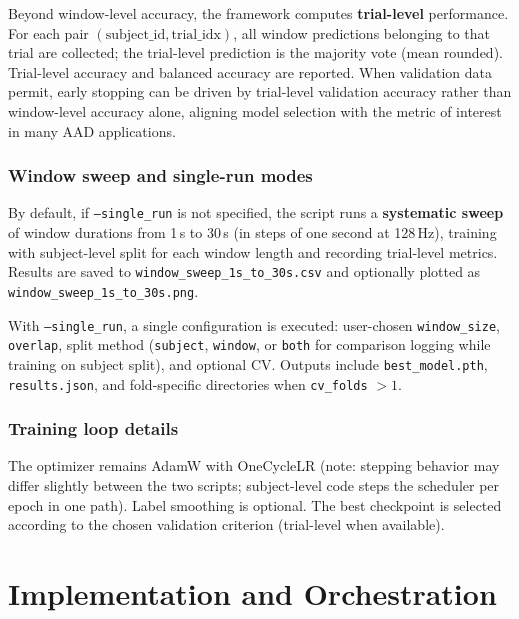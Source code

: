 \documentclass[11pt,a4paper]{article}
\newcommand{\py}[1]{\texttt{#1}}
\begin{document}
Beyond window-level accuracy, the framework computes \textbf{trial-level} performance. For each pair $(\text{subject\_id}, \text{trial\_idx})$, all window predictions belonging to that trial are collected; the trial-level prediction is the majority vote (mean rounded). Trial-level accuracy and balanced accuracy are reported. When validation data permit, early stopping can be driven by trial-level validation accuracy rather than window-level accuracy alone, aligning model selection with the metric of interest in many AAD applications.

\subsubsection{Window sweep and single-run modes}

By default, if \texttt{--single\_run} is not specified, the script runs a \textbf{systematic sweep} of window durations from 1\,s to 30\,s (in steps of one second at 128\,Hz), training with subject-level split for each window length and recording trial-level metrics. Results are saved to \py{window\_sweep\_1s\_to\_30s.csv} and optionally plotted as \py{window\_sweep\_1s\_to\_30s.png}.

With \texttt{--single\_run}, a single configuration is executed: user-chosen \texttt{window\_size}, \texttt{overlap}, split method (\texttt{subject}, \texttt{window}, or \texttt{both} for comparison logging while training on subject split), and optional CV. Outputs include \py{best\_model.pth}, \py{results.json}, and fold-specific directories when \texttt{cv\_folds} $> 1$.

\subsubsection{Training loop details}

The optimizer remains AdamW with OneCycleLR (note: stepping behavior may differ slightly between the two scripts; subject-level code steps the scheduler per epoch in one path). Label smoothing is optional. The best checkpoint is selected according to the chosen validation criterion (trial-level when available).

\section{Implementation and Orchestration}
\label{sec:impl}
\end{document}
